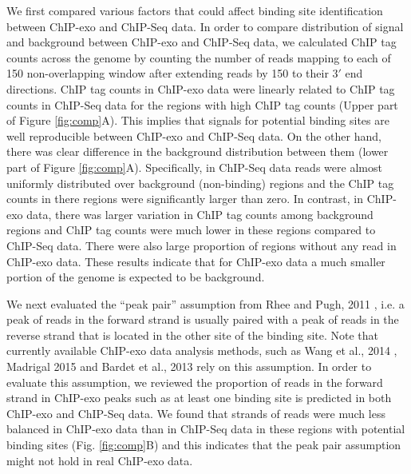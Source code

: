 \documentclass{bmcart}\usepackage[]{graphicx}\usepackage[]{color}
\begin{document}
We first compared various factors that could affect binding site
identification between ChIP-exo and ChIP-Seq data. In order to compare
distribution of signal and background between ChIP-exo and ChIP-Seq
data, we calculated ChIP tag counts across the genome by counting the
number of reads mapping to each of 150 non-overlapping
window after extending reads by 150 to their $3\prime$
end directions. ChIP tag counts in ChIP-exo data were linearly related
to ChIP tag counts in ChIP-Seq data for the regions with high ChIP tag
counts (Upper part of Figure \ref{fig:comp}A). This implies that
signals for potential binding sites are well reproducible between
ChIP-exo and ChIP-Seq data. On the other hand, there was clear
difference in the background distribution between them (lower part of
Figure \ref{fig:comp}A). Specifically, in ChIP-Seq data reads were
almost uniformly distributed over background (non-binding) regions and
the ChIP tag counts in there regions were significantly larger than
zero. In contrast, in ChIP-exo data, there was larger variation in
ChIP tag counts among background regions and ChIP tag counts were much
lower in these regions compared to ChIP-Seq data. There were also
large proportion of regions without any read in ChIP-exo data. These
results indicate that for ChIP-exo data a much smaller portion of the
genome is expected to be background.

We next evaluated the ``peak pair'' assumption from Rhee and Pugh,
2011 \cite{exo1}, i.e. a peak of reads in the forward strand is
usually paired with a peak of reads in the reverse strand that is
located in the other site of the binding site. Note that currently
available ChIP-exo data analysis methods, such as Wang et al., 2014
\cite{mace}, Madrigal 2015 \cite{cexor} and Bardet et al., 2013
\cite{peakzilla} rely on this assumption. In order to evaluate this
assumption, we reviewed the proportion of reads in the forward strand
in ChIP-exo peaks such as at least one binding site is predicted in
both ChIP-exo and ChIP-Seq data. We found that strands of reads were
much less balanced in ChIP-exo data than in ChIP-Seq data in these
regions with potential binding sites (Fig. \ref{fig:comp}B) and this
indicates that the peak pair assumption might not hold in real
ChIP-exo data.
\end{document}
